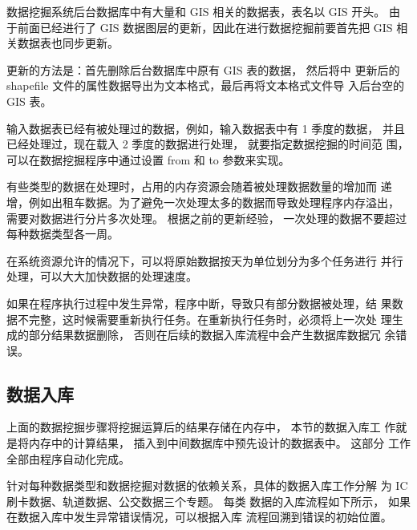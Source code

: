 数据挖掘系统后台数据库中有大量和 GIS 相关的数据表，表名以 GIS 开头。
由于前面已经进行了 GIS 数据图层的更新，因此在进行数据挖掘前要首先把 GIS
相关数据表也同步更新。

更新的方法是：首先删除后台数据库中原有 GIS 表的数据， 然后将中
更新后的 shapefile 文件的属性数据导出为文本格式，最后再将文本格式文件导
入后台空的 GIS 表。

输入数据表已经有被处理过的数据，例如，输入数据表中有 1 季度的数据，
并且已经处理过，现在载入 2 季度的数据进行处理， 就要指定数据挖掘的时间范
围， 可以在数据挖掘程序中通过设置 from 和 to 参数来实现。

有些类型的数据在处理时，占用的内存资源会随着被处理数据数量的增加而
递增，例如出租车数据。为了避免一次处理太多的数据而导致处理程序内存溢出，
需要对数据进行分片多次处理。 根据之前的更新经验， 一次处理的数据不要超过
每种数据类型各一周。

在系统资源允许的情况下，可以将原始数据按天为单位划分为多个任务进行
并行处理，可以大大加快数据的处理速度。

如果在程序执行过程中发生异常，程序中断，导致只有部分数据被处理，结
果数据不完整，这时候需要重新执行任务。在重新执行任务时，必须将上一次处
理生成的部分结果数据删除， 否则在后续的数据入库流程中会产生数据库数据冗
余错误。

\subsection{数据入库}
上面的数据挖掘步骤将挖掘运算后的结果存储在内存中， 本节的数据入库工
作就是将内存中的计算结果， 插入到中间数据库中预先设计的数据表中。 这部分
工作全部由程序自动化完成。

针对每种数据类型和数据挖掘对数据的依赖关系，具体的数据入库工作分解
为 IC 刷卡数据、轨道数据、公交数据三个专题。 每类
数据的入库流程如下所示， 如果在数据入库中发生异常错误情况，可以根据入库
流程回溯到错误的初始位置。

